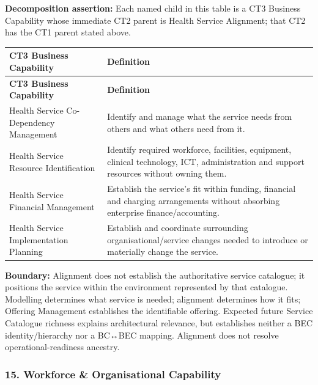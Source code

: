 \label{rad:business:895}

\textbf{Decomposition assertion:} Each named child in this table is a CT3 Business Capability whose immediate CT2 parent is Health Service Alignment; that CT2 has the CT1 parent stated above.

\label{rad:business:897}
\begingroup\small\setlength{\TableWidth}{\dimexpr\linewidth-4\tabcolsep-3\arrayrulewidth\relax}
\begin{longtable}{|>{\raggedright\arraybackslash}p{0.35\TableWidth}|>{\raggedright\arraybackslash}p{0.65\TableWidth}|}
\hline\rowcolor{TableHead}\textbf{CT3 Business Capability} & \textbf{Definition}\\\hline\endfirsthead
\hline\rowcolor{TableHead}\textbf{CT3 Business Capability} & \textbf{Definition}\\\hline\endhead
\hline\endfoot
Health Service Co-Dependency Management & Identify and manage what the service needs from others and what others need from it.\\\hline
Health Service Resource Identification & Identify required workforce, facilities, equipment, clinical technology, ICT, administration and support resources without owning them.\\\hline
Health Service Financial Management & Establish the service’s fit within funding, financial and charging arrangements without absorbing enterprise finance/\allowbreak{}accounting.\\\hline
Health Service Implementation Planning & Establish and coordinate surrounding organisational/\allowbreak{}service changes needed to introduce or materially change the service.\\\hline
\end{longtable}\endgroup
{}\label{rad:business:904}

\textbf{Boundary:} Alignment does not establish the authoritative service catalogue; it positions the service within the environment represented by that catalogue. Modelling determines what service is needed; alignment determines how it fits; Offering Management establishes the identifiable offering. Expected future Service Catalogue richness explains architectural relevance, but establishes neither a BEC identity/\allowbreak{}hierarchy nor a BC↔BEC mapping. Alignment does not resolve operational-readiness ancestry.

\label{rad:business:906}
\subsubsection*{15. Workforce \& Organisational Capability}
\label{rad:business:908}

